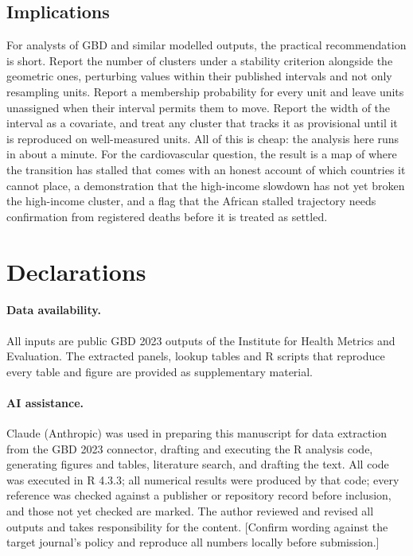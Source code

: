 \documentclass[11pt,a4paper]{article}
\begin{document}
\subsection{Implications}

For analysts of GBD and similar modelled outputs, the practical recommendation is short. Report the number of clusters under a stability criterion alongside the geometric ones, perturbing values within their published intervals and not only resampling units. Report a membership probability for every unit and leave units unassigned when their interval permits them to move. Report the width of the interval as a covariate, and treat any cluster that tracks it as provisional until it is reproduced on well-measured units. All of this is cheap: the analysis here runs in about a minute. For the cardiovascular question, the result is a map of where the transition has stalled that comes with an honest account of which countries it cannot place, a demonstration that the high-income slowdown has not yet broken the high-income cluster, and a flag that the African stalled trajectory needs confirmation from registered deaths before it is treated as settled.

\section*{Declarations}

\paragraph{Data availability.} All inputs are public GBD 2023 outputs of the Institute for Health Metrics and Evaluation. The extracted panels, lookup tables and R scripts that reproduce every table and figure are provided as supplementary material.

\paragraph{AI assistance.} Claude (Anthropic) was used in preparing this manuscript for data extraction from the GBD 2023 connector, drafting and executing the R analysis code, generating figures and tables, literature search, and drafting the text. All code was executed in R 4.3.3; all numerical results were produced by that code; every reference was checked against a publisher or repository record before inclusion, and those not yet checked are marked. The author reviewed and revised all outputs and takes responsibility for the content. [Confirm wording against the target journal's policy and reproduce all numbers locally before submission.]
\end{document}
